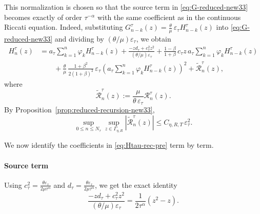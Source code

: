 \documentclass[letterpaper]{article}
\numberwithin{equation}{section}
\theoremstyle{definition}
\theoremstyle{remark}
\begin{document}
This normalization is chosen so that the source term in
\eqref{eq:G-reduced-new33} becomes exactly of order $\tau^{-\alpha}$ with the same coefficient as in the continuous Riccati equation. Indeed, substituting
$G_{n-k}^\tau(z)=\frac{\theta}{\mu}\,\varepsilon_\tau H_{n-k}^\tau(z)$
into \eqref{eq:G-reduced-new33} and dividing by $(\theta/\mu)\varepsilon_\tau$, we obtain
\begin{equation}\label{eq:Htau-rec-pre}
\begin{aligned}
  H_n^\tau(z)
  &= a_\tau\sum_{k=1}^n \varphi_k H_{n-k}^\tau(z)
     +\frac{-zd_\tau+c_\tau^2z^2}{(\theta/\mu)\varepsilon_\tau}
     +\frac{1-\beta}{1+\beta}\,c_\tau z\,
      a_\tau\sum_{k=1}^n \varphi_k H_{n-k}^\tau(z)
\\
  &\qquad
     +\frac{\theta}{\mu}\,
      \frac{1+\beta^2}{2(1+\beta)^2}\,
      \varepsilon_\tau
      \left(a_\tau\sum_{k=1}^n \varphi_k H_{n-k}^\tau(z)\right)^2
     +\widetilde{\mathcal R}_n^\tau(z),
\end{aligned}
\end{equation}
where
\begin{equation}\label{eq:Rtilde-def}
  \widetilde{\mathcal R}_n^\tau(z)
  :=\frac{\mu}{\theta\,\varepsilon_\tau}\mathcal R_n^\tau(z).
\end{equation}
By Proposition~\ref{prop:reduced-recursion-new33},
\begin{equation}\label{eq:Rtilde-bound}
  \sup_{0\le n\le N_\tau}\sup_{z\in\Gamma_{\eta,R}}
  |\widetilde{\mathcal R}_n^\tau(z)|
  \le C_{\eta,R,T}\,\varepsilon_\tau^2.
\end{equation}

We now identify the coefficients in \eqref{eq:Htau-rec-pre} term by term.

\paragraph{Source term}
Using
$c_\tau^2=\frac{\theta\varepsilon_\tau}{2\mu\tau^\alpha}$
and
$d_\tau=\frac{\theta\varepsilon_\tau}{2\mu\tau^\alpha}$,
we get the exact identity
\begin{equation}\label{eq:source-match}
  \frac{-zd_\tau+c_\tau^2z^2}{(\theta/\mu)\varepsilon_\tau}
  =\frac{1}{2\tau^\alpha}(z^2-z).
\end{equation}
\end{document}
